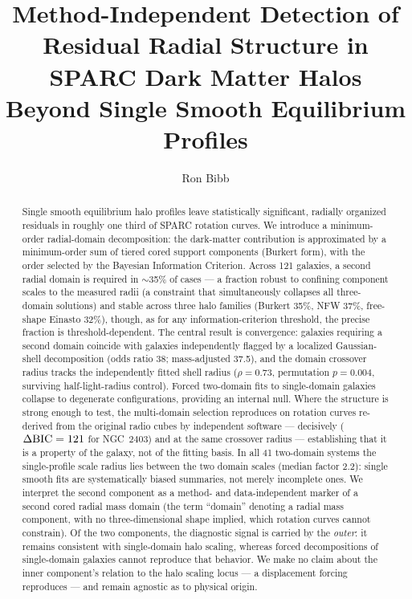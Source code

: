 \documentclass[twocolumn]{aastex701}
\newcommand{\dbic}{\Delta{\rm BIC}}
\begin{document}
\title{Method-Independent Detection of Residual Radial Structure in SPARC
Dark Matter Halos Beyond Single Smooth Equilibrium Profiles}

\author[0009-0004-1153-2464]{Ron Bibb}

\begin{abstract}
Single smooth equilibrium halo profiles leave statistically significant,
radially organized residuals in roughly one third of SPARC rotation curves.
We introduce a minimum-order radial-domain decomposition: the dark-matter
contribution is approximated by a minimum-order sum of tiered cored support
components (Burkert form), with the order selected by the Bayesian
Information Criterion. Across 121 galaxies, a second radial domain is required
in $\sim$35\% of cases --- a fraction robust to confining component scales to
the measured radii (a constraint that simultaneously collapses all
three-domain solutions) and stable across three halo families (Burkert 35\%,
NFW 37\%, free-shape Einasto 32\%), though, as for any information-criterion
threshold, the precise fraction is threshold-dependent. The central result is
convergence: galaxies requiring a second domain coincide with galaxies
independently flagged by a localized Gaussian-shell decomposition (odds ratio
38; mass-adjusted 37.5), and the domain crossover radius tracks the
independently fitted shell radius ($\rho = 0.73$, permutation $p = 0.004$,
surviving half-light-radius control). Forced two-domain fits to single-domain
galaxies collapse to degenerate configurations, providing an internal null.
Where the structure is strong enough to test, the multi-domain selection
reproduces on rotation curves re-derived from the original radio cubes by
independent software --- decisively ($\dbic = 121$ for NGC~2403) and at the
same crossover radius --- establishing that it is a property of the galaxy,
not of the fitting basis. In all 41 two-domain systems the single-profile
scale radius lies between the two domain scales (median factor 2.2): single
smooth fits are systematically biased summaries, not merely incomplete ones.
We interpret the second component as a method- and data-independent marker of
a second cored radial mass domain (the term ``domain'' denoting a radial mass
component, with no three-dimensional shape implied, which rotation curves
cannot constrain). Of the two components, the diagnostic signal is carried by
the \emph{outer}: it remains consistent with single-domain halo scaling,
whereas forced decompositions of single-domain galaxies cannot reproduce that
behavior. We make no claim about the inner component's relation to the halo
scaling locus --- a displacement forcing reproduces --- and remain agnostic
as to physical origin.
\end{abstract}
\end{document}
